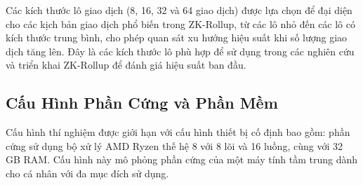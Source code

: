 Các kích thước lô giao dịch (8, 16, 32 và 64 giao dịch) được lựa chọn để đại diện cho các kịch bản giao dịch phổ biến trong ZK-Rollup, từ các lô nhỏ đến các lô có kích thước trung bình, cho phép quan sát xu hướng hiệu suất khi số lượng giao dịch tăng lên. Đây là các kích thước lô phù hợp để sử dụng trong các nghiên cứu và triển khai ZK-Rollup để đánh giá hiệu suất ban đầu.

\subsection{Cấu Hình Phần Cứng và Phần Mềm}
Cấu hình thí nghiệm được giới hạn với cấu hình thiết bị cố định bao gồm: phần cứng sử dụng bộ xử lý AMD Ryzen thế hệ 8 với 8 lõi và 16 luồng, cùng với 32 GB RAM. Cấu hình này mô phỏng phần cứng của một máy tính tầm trung dành cho cá nhân với đa mục đích sử dụng.


